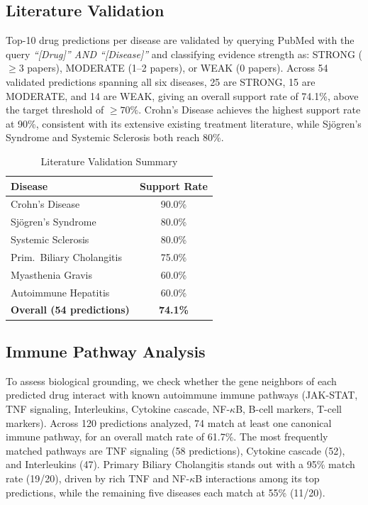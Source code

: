 \documentclass[conference]{IEEEtran}
\begin{document}
\subsection{Literature Validation}

Top-10 drug predictions per disease are validated by querying PubMed with the query \textit{``[Drug]'' AND ``[Disease]''} and classifying evidence strength as: STRONG ($\geq 3$ papers), MODERATE (1--2 papers), or WEAK (0 papers). Across 54 validated predictions spanning all six diseases, 25 are STRONG, 15 are MODERATE, and 14 are WEAK, giving an overall support rate of 74.1\%, above the target threshold of $\geq 70\%$. Crohn's Disease achieves the highest support rate at 90\%, consistent with its extensive existing treatment literature, while Sj\"{o}gren's Syndrome and Systemic Sclerosis both reach 80\%.

\begin{table}[!t]
\caption{Literature Validation Summary}
\label{tab:literature}
\centering
\footnotesize
\renewcommand{\arraystretch}{1.4}
\begin{tabular}{p{2.8cm}c}
\toprule
\textbf{Disease} & \textbf{Support Rate} \\
\midrule
Crohn's Disease & 90.0\% \\
Sj\"{o}gren's Syndrome & 80.0\% \\
Systemic Sclerosis & 80.0\% \\
Prim.\ Biliary Cholangitis & 75.0\% \\
Myasthenia Gravis & 60.0\% \\
Autoimmune Hepatitis & 60.0\% \\
\midrule
\textbf{Overall (54 predictions)} & \textbf{74.1\%} \\
\bottomrule
\end{tabular}
\end{table}

\subsection{Immune Pathway Analysis}

To assess biological grounding, we check whether the gene neighbors of each predicted drug interact with known autoimmune immune pathways (JAK-STAT, TNF signaling, Interleukins, Cytokine cascade, NF-$\kappa$B, B-cell markers, T-cell markers). Across 120 predictions analyzed, 74 match at least one canonical immune pathway, for an overall match rate of 61.7\%. The most frequently matched pathways are TNF signaling (58 predictions), Cytokine cascade (52), and Interleukins (47). Primary Biliary Cholangitis stands out with a 95\% match rate (19/20), driven by rich TNF and NF-$\kappa$B interactions among its top predictions, while the remaining five diseases each match at 55\% (11/20).
\end{document}
